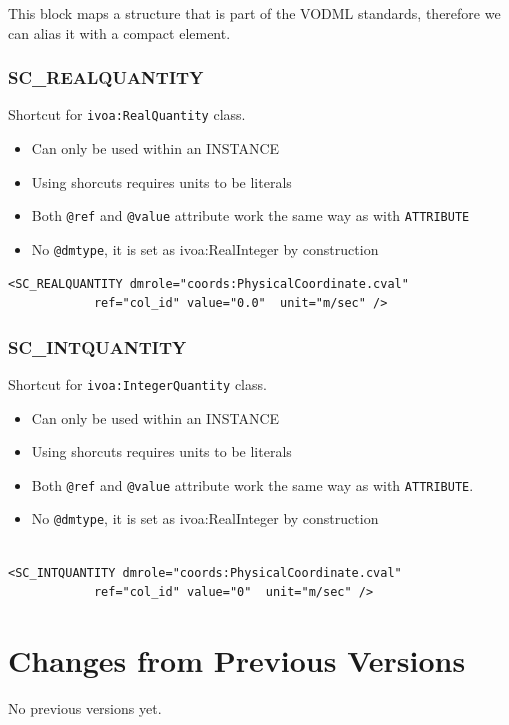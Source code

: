 \documentclass[11pt,a4paper]{ivoa}
\begin{document}
This block maps a structure that is part of the VODML standards, therefore we can alias it with a compact element.

\subsubsection{SC\_REALQUANTITY}
Shortcut for \texttt{ivoa:RealQuantity} class.

\begin{itemize}
    \item Can only be used within an INSTANCE      
    \item Using shorcuts requires units to be literals   
    \item Both \texttt{@ref} and \texttt{@value} attribute work the same way as with \texttt{ATTRIBUTE}
    \item No \texttt{@dmtype},  it is set as ivoa:RealInteger by construction
 \end{itemize}


\begin{lstlisting}[caption={\texttt{ivoa:RealQuantity} example},style=XML]
<SC_REALQUANTITY dmrole="coords:PhysicalCoordinate.cval"
            ref="col_id" value="0.0"  unit="m/sec" />
\end{lstlisting}

\subsubsection{SC\_INTQUANTITY}
Shortcut for \texttt{ivoa:IntegerQuantity} class.

\begin{itemize}
    \item Can only be used within an INSTANCE        
    \item Using shorcuts requires units to be literals    
    \item Both \texttt{@ref} and \texttt{@value} attribute work the same way as with \texttt{ATTRIBUTE}.
    \item No \texttt{@dmtype},  it is set as ivoa:RealInteger by construction
 \end{itemize}


\begin{lstlisting}[caption={\texttt{ivoa:IntegerQuantity} example},style=XML,basicstyle=\small]

<SC_INTQUANTITY dmrole="coords:PhysicalCoordinate.cval"
            ref="col_id" value="0"  unit="m/sec" />
\end{lstlisting}


\appendix

\section{Changes from Previous Versions}

No previous versions yet.  



\end{document}
